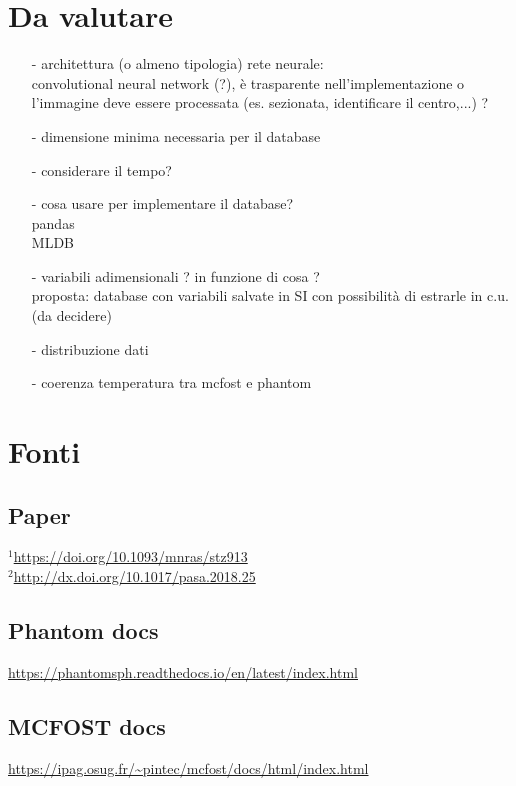 \documentclass[DIN, pagenumber=false, fontsize=11pt, parskip=half]{scrartcl}
\begin{document}
\section{Da valutare}
\begin{enumerate}
 \item[-] architettura (o almeno tipologia) rete neurale: \\ convolutional neural network (?), è trasparente nell'implementazione o l'immagine deve essere processata (es. sezionata, identificare il centro,...) ?
 \item[-] dimensione minima necessaria per il database
 \item[-] considerare il tempo?
 \item[-] cosa usare per implementare il database? \\ pandas \\ MLDB 
 \item[-] variabili adimensionali ? in funzione di cosa ? \\ proposta: database con variabili salvate in SI con possibilità di estrarle in c.u. (da decidere)
 \item[-] distribuzione dati
 \item[-] coerenza temperatura tra mcfost e phantom
\end{enumerate}

\section{Fonti}

\subsection{Paper}
\label{source}
 $^1$\url{https://doi.org/10.1093/mnras/stz913} \\
 $^2$\url{http://dx.doi.org/10.1017/pasa.2018.25}
\subsection{Phantom docs}
\url{https://phantomsph.readthedocs.io/en/latest/index.html}

\subsection{MCFOST docs}
\url{https://ipag.osug.fr/~pintec/mcfost/docs/html/index.html}
\end{document}
